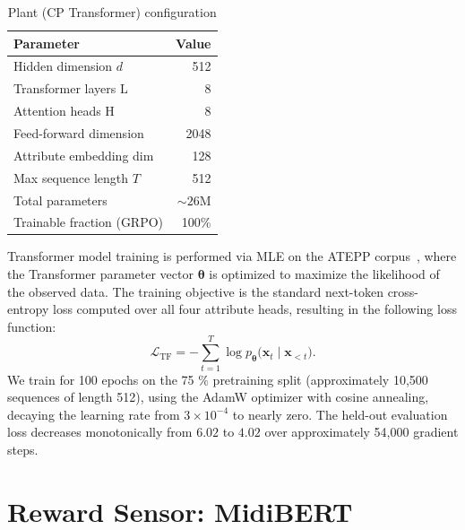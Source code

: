 \documentclass[letterpaper, 10 pt, conference]{ieeeconf}
\begin{document}
\begin{table}[t!]
\centering
\caption{Plant (CP Transformer) configuration}
\label{tab:plant}
\begin{tabular}{@{}lr@{}}
\toprule
\textbf{Parameter} & \textbf{Value} \\
\midrule
Hidden dimension $d$ & 512 \\
Transformer layers $\text{L}$ & 8 \\
Attention heads $\text{H}$ & 8 \\
Feed-forward dimension & 2048 \\
Attribute embedding dim & 128 \\
Max sequence length $T$ & 512 \\
Total parameters & ${\sim}26$M \\
Trainable fraction (GRPO) & 100\% \\
\bottomrule
\end{tabular}
\end{table}

\par Transformer model training is performed via MLE on the ATEPP corpus~\cite{atepp}, where the Transformer parameter vector  $\bm{\theta}$ is optimized to maximize the likelihood of the observed data.
The training objective is the standard next-token cross-entropy loss computed over all four attribute heads, resulting in the following loss function:
\begin{equation}
    \mathcal{L}_{\mathrm{TF}} = -\sum_{t=1}^{T}  \log p_{\bm{\theta}}\bigl(\textbf{x}_{t} \mid \textbf{x}_{<t}\bigr).
\end{equation}
We train for 100 epochs on the 75 $\%$ pretraining split (approximately 10,500 sequences of length 512), using the AdamW optimizer with cosine annealing, decaying the learning rate from $3 \times 10^{-4}$ to nearly zero. The held-out evaluation loss decreases monotonically from $6.02$ to $4.02$ over approximately 54,000 gradient steps.
\section{Reward Sensor: MidiBERT}
\end{document}
